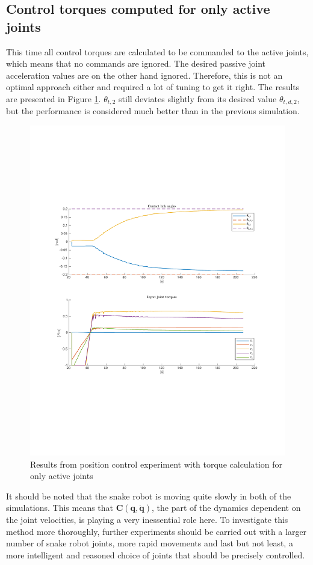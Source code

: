\subsection{Control torques computed for only active joints}

This time all control torques are calculated to be commanded to the active joints, which means that no commands are ignored. The desired passive joint acceleration values are on the other hand ignored. Therefore, this is not an optimal approach either and required a lot of tuning to get it right. The results are presented in Figure \ref{fig:2xp-2}. $\theta_{t,2}$ still deviates slightly from its desired value $\theta_{t,d,2}$, but the performance is considered much better than in the previous simulation.

\begin{figure}
    \centering
    \includegraphics[trim=2.1cm 6cm 2.1cm 6cm, clip=true, width=\textwidth]{figures/experiments/2xpos/2xpos-2plot.pdf}
    \caption{Results from position control experiment with torque calculation for only active joints}
    \label{fig:2xp-2}
\end{figure}

It should be noted that the snake robot is moving quite slowly in both of the simulations. This means that $\mathbf{C(q,\dot{q})}$, the part of the dynamics dependent on the joint velocities, is playing a very inessential role here. To investigate this method more thoroughly, further experiments should be carried out with a larger number of snake robot joints, more rapid movements and last but not least, a more intelligent and reasoned choice of joints that should be precisely controlled.